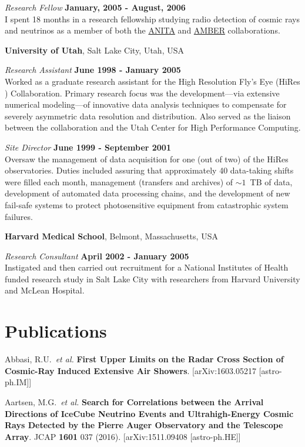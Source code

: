 \begin{resume}
{\em Research Fellow} \hfill {\bf January, 2005 - August, 2006}\\
I spent 18 months in a research fellowship studying radio
    detection of cosmic rays and neutrinos as a member of both the
    \href{http://arxiv.org/abs/astro-ph/0512265}{ANITA} and
    \href{http://arxiv.org/abs/0705.2589}{AMBER} collaborations.


{\bf University of Utah}, Salt Lake City, Utah, USA

\vspace{-.3cm}
{\em Research Assistant} \hfill {\bf June 1998 - January 2005}\\
Worked as a graduate research assistant for the High Resolution Fly's Eye (HiRes
) Collaboration.  Primary research focus was the development---via extensive
numerical modeling---of innovative data analysis techniques to compensate
for severely asymmetric data resolution and distribution. Also served as the
liaison between the collaboration and the Utah Center for High Performance
Computing.

{\em Site Director} \hfill {\bf June 1999 - September 2001}\\
Oversaw the management of data acquisition for one (out of two) of the HiRes
observatories.  Duties included assuring that approximately 40 data-taking
shifts were filled each month, management (transfers and archives) of
$\sim1$~TB of data, development of automated data processing chains,
and the development of new fail-safe systems to protect
photosensitive equipment from catastrophic system failures.

{\bf Harvard Medical School}, Belmont, Massachusetts, USA

\vspace{-.3cm}
{\em Research Consultant} \hfill {\bf April 2002 - January 2005}\\
Instigated and then carried out recruitment for a National Institutes of Health
funded research study in Salt Lake City with researchers from Harvard
University and McLean Hospital.

\section{\sc Publications}

Abbasi, R.U.\ {\it et al.} {\bf First Upper Limits on the Radar Cross Section of Cosmic-Ray Induced Extensive Air Showers}. [arXiv:1603.05217 [astro-ph.IM]]

Aartsen, M.G.\ {\it et al.} {\bf Search for Correlations between the Arrival Directions of IceCube Neutrino Events and Ultrahigh-Energy Cosmic Rays Detected by the Pierre Auger Observatory and the Telescope Array}. JCAP {\bf 1601} 037 (2016). [arXiv:1511.09408 [astro-ph.HE]]


\end{resume}
